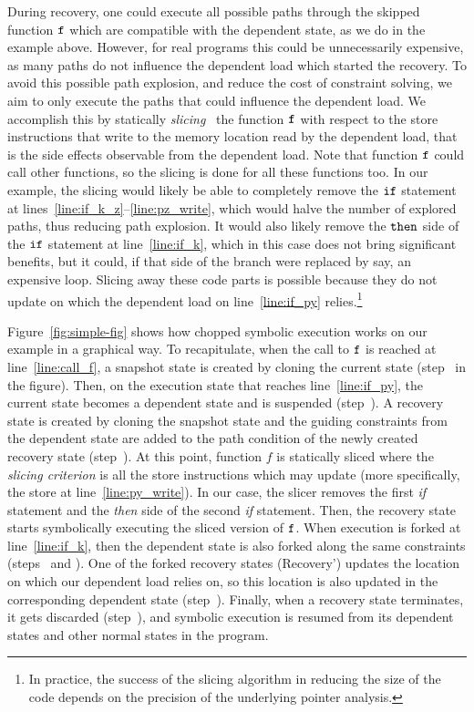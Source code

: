 During recovery, one could execute all possible paths through the
skipped function $\texttt{f}$ which are compatible with the dependent
state, as we do in the example above. However, for real programs this
could be unnecessarily expensive, as many paths do not influence the
dependent load which started the recovery. To avoid this possible path
explosion, and reduce the cost of constraint solving, we aim to only
execute the paths that could influence the dependent load. We
accomplish this by statically \emph{slicing}~\cite{Weiser:ICSE1981,
  Tip95asurvey, BinkleyH04, Xu:Slicing2005} the function $\texttt{f}$
with respect to the store instructions that write to the memory
location read by the dependent load, that is the side effects
observable from the dependent load. Note that function $\texttt{f}$
could call other functions, so the slicing is done for all these
functions too. In our example, the slicing would likely be able to
completely remove the $\texttt{if}$ statement at
lines~\ref{line:if_k_z}--\ref{line:pz_write}, which would halve the
number of explored paths, thus reducing path explosion. It would also
likely remove the $\texttt{then}$ side of the $\texttt{if}$ statement at
line~\ref{line:if_k}, which in this case does not bring significant
benefits, but it could, if that side of the branch were replaced by
say, an expensive loop. Slicing away these code parts is possible
because they do not update  on which the dependent load on
line~\ref{line:if_py} relies.\footnote{In practice, the success of the
  slicing algorithm in reducing the size of the code depends on the
  precision of the underlying pointer analysis.}

Figure~\ref{fig:simple-fig} shows how chopped symbolic execution works
on our example in a graphical way. To recapitulate, when the call to
$\texttt{f}$ is reached at line~\ref{line:call_f}, a snapshot state is
created by cloning the current state (step~ in the figure).
Then, on the execution state that reaches
line~\ref{line:if_py}, the current state becomes a dependent state and
is suspended (step~).
A recovery state is created by cloning the snapshot state
and the guiding constraints from the dependent state are added
to the path condition of the newly created recovery state (step~).
At this point, function $f$ is statically sliced
where the \textit{slicing criterion} is all the store instructions
which may update  (more specifically, the store at line~\ref{line:py_write}).
In our case, the slicer removes the first \textit{if} statement and the \textit{then} side
of the second \textit{if} statement. Then, the recovery state starts
symbolically executing the sliced version of $\texttt{f}$.  When execution
is forked at line~\ref{line:if_k}, then the dependent state is also
forked along the same constraints (steps~ and ). One
of the forked recovery states (Recovery') updates the location
 on which our dependent load relies on, so this location is
also updated in the corresponding dependent state
(step~). Finally, when a recovery state terminates,
it gets discarded  (step~), and
symbolic execution is resumed from its dependent states  and other
normal states in the program.

